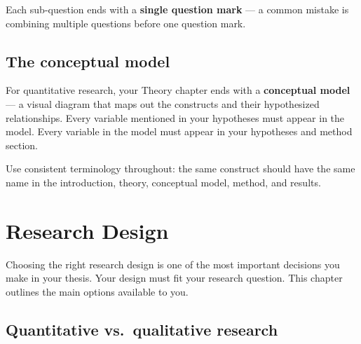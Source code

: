 \documentclass[
  11pt,
  a4paper,
]{scrbook}
\begin{document}
Each sub-question ends with a \textbf{single question mark} --- a common
mistake is combining multiple questions before one question mark.

\section{The conceptual model}\label{the-conceptual-model}

For quantitative research, your Theory chapter ends with a
\textbf{conceptual model} --- a visual diagram that maps out the
constructs and their hypothesized relationships. Every variable
mentioned in your hypotheses must appear in the model. Every variable in
the model must appear in your hypotheses and method section.

Use consistent terminology throughout: the same construct should have
the same name in the introduction, theory, conceptual model, method, and
results.

\chapter{Research Design}\label{research-design-1}

Choosing the right research design is one of the most important
decisions you make in your thesis. Your design must fit your research
question. This chapter outlines the main options available to you.

\section{Quantitative vs.~qualitative
research}\label{quantitative-vs.-qualitative-research}
\end{document}
